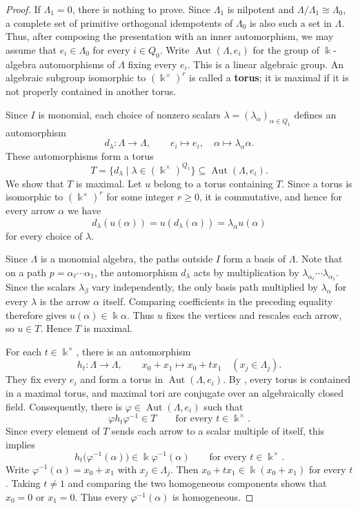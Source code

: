 \documentclass[11pt]{article}
\DeclareMathOperator{\Aut}{Aut}
\newcommand{\defn}[1]{\textbf{#1}}
\theoremstyle{definition}
\begin{document}
		\begin{proof}
			If $\Lambda_1=0$, there is nothing to prove. 
			Since $\Lambda_1$ is nilpotent and $\Lambda/\Lambda_1\cong \Lambda_0$, a complete set of primitive orthogonal idempotents of $\Lambda_0$ is also such a set in $\Lambda$. 
			Thus, after composing the presentation with an inner automorphism, we may assume that $e_i\in \Lambda_0$ for every $i\in Q_0$.
			Write $\Aut(\Lambda,e_i)$ for the group of $\Bbbk$-algebra automorphisms of $\Lambda$ fixing every $e_i$.
			This is a linear algebraic group.
			An algebraic subgroup isomorphic to $(\Bbbk^\times)^r$ is called a \defn{torus}; it is maximal if it is not properly contained in another torus.

			Since $I$ is monomial, each choice of nonzero scalars
			$\lambda=(\lambda_\alpha)_{\alpha\in Q_1}$ defines an automorphism
			\[
				d_\lambda:\Lambda\longrightarrow \Lambda,\qquad
				e_i\longmapsto e_i,\quad
				\alpha\longmapsto\lambda_\alpha\alpha.
			\]
			These automorphisms form a torus
			\[
				T=\{d_\lambda\mid
				\lambda\in(\Bbbk^\times)^{Q_1}\}
				\subseteq\Aut(\Lambda,e_i).
			\]
			We show that $T$ is maximal.
			Let $u$ belong to a torus containing $T$.
			Since a torus is isomorphic to $(\Bbbk^\times)^r$ for some integer $r\geq 0$, it is commutative, and hence for every arrow $\alpha$ we have
			\[
				d_\lambda(u(\alpha))
				=u(d_\lambda(\alpha))
				=\lambda_\alpha u(\alpha)
			\]
			for every choice of $\lambda$.

			Since $\Lambda$ is a monomial algebra, the paths outside $I$ form a basis of $\Lambda$.
			Note that on a path $p=\alpha_\ell\cdots\alpha_1$, the automorphism $d_\lambda$ acts by multiplication by $\lambda_{\alpha_\ell}\cdots\lambda_{\alpha_1}$.
			Since the scalars $\lambda_\beta$ vary independently, the only basis path multiplied by $\lambda_\alpha$ for every $\lambda$ is the arrow $\alpha$ itself.
			Comparing coefficients in the preceding equality therefore gives $u(\alpha)\in\Bbbk\alpha$.
			Thus $u$ fixes the vertices and rescales each arrow, so $u\in T$.
			Hence $T$ is maximal.

			For each $t\in\Bbbk^\times$, there is an automorphism
			\[
				h_t:\Lambda\longrightarrow\Lambda,\qquad
				x_0+x_1\longmapsto x_0+tx_1
				\quad(x_j\in\Lambda_j).
			\]
			They fix every $e_i$ and form a torus in $\Aut(\Lambda,e_i)$.
			By \cite[Theorem~17.10]{MilneAlgebraicGroups}, every torus is contained in a maximal torus, and maximal tori are conjugate over an algebraically closed field.
			Consequently, there is
			$\varphi\in\Aut(\Lambda,e_i)$ such that
			\[
				\varphi h_t\varphi^{-1}\in T
				\qquad\text{for every }t\in\Bbbk^\times.
			\]
			Since every element of $T$ sends each arrow to a scalar multiple of itself, this implies
			\[
				h_t\bigl(\varphi^{-1}(\alpha)\bigr)
				\in\Bbbk\varphi^{-1}(\alpha)
				\qquad\text{for every }t\in\Bbbk^\times.
			\]
			Write $\varphi^{-1}(\alpha)=x_0+x_1$ with $x_j\in \Lambda_j$.
			Then $x_0+tx_1\in\Bbbk(x_0+x_1)$ for every $t$.
			Taking $t\neq1$ and comparing the two homogeneous components shows that $x_0=0$ or $x_1=0$.
			Thus every $\varphi^{-1}(\alpha)$ is homogeneous.


\end{proof}
\end{document}
